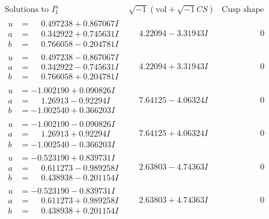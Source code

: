 \documentclass[1p]{elsarticle_modified}
\theoremstyle{definition}
\newcommand{\I}{\sqrt{-1}}
\begin{document}
$$\begin{array}{c|c|c}  
\text{Solutions to }I^u_{1}& \I (\text{vol} + \sqrt{-1}CS) & \text{Cusp shape}\\
 \hline 
\begin{aligned}
u &= \phantom{-}0.497238 + 0.867067 I \\
a &= \phantom{-}0.342922 + 0.745631 I \\
b &= \phantom{-}0.766058 - 0.204781 I\end{aligned}
 & \phantom{-}4.22094 - 3.31943 I & \phantom{-0.000000 } 0 \\ \hline\begin{aligned}
u &= \phantom{-}0.497238 - 0.867067 I \\
a &= \phantom{-}0.342922 - 0.745631 I \\
b &= \phantom{-}0.766058 + 0.204781 I\end{aligned}
 & \phantom{-}4.22094 + 3.31943 I & \phantom{-0.000000 } 0 \\ \hline\begin{aligned}
u &= -1.002190 + 0.090826 I \\
a &= \phantom{-}1.26913 - 0.92294 I \\
b &= -1.002540 + 0.366203 I\end{aligned}
 & \phantom{-}7.64125 - 4.06324 I & \phantom{-0.000000 } 0 \\ \hline\begin{aligned}
u &= -1.002190 - 0.090826 I \\
a &= \phantom{-}1.26913 + 0.92294 I \\
b &= -1.002540 - 0.366203 I\end{aligned}
 & \phantom{-}7.64125 + 4.06324 I & \phantom{-0.000000 } 0 \\ \hline\begin{aligned}
u &= -0.523190 + 0.839731 I \\
a &= \phantom{-}0.611273 - 0.989258 I \\
b &= \phantom{-}0.438938 - 0.201154 I\end{aligned}
 & \phantom{-}2.63803 - 4.74363 I & \phantom{-0.000000 } 0 \\ \hline\begin{aligned}
u &= -0.523190 - 0.839731 I \\
a &= \phantom{-}0.611273 + 0.989258 I \\
b &= \phantom{-}0.438938 + 0.201154 I\end{aligned}
 & \phantom{-}2.63803 + 4.74363 I & \phantom{-0.000000 } 0 \\ \hline\begin{aligned}

\end{aligned}
\end{array}$$
\end{document}
